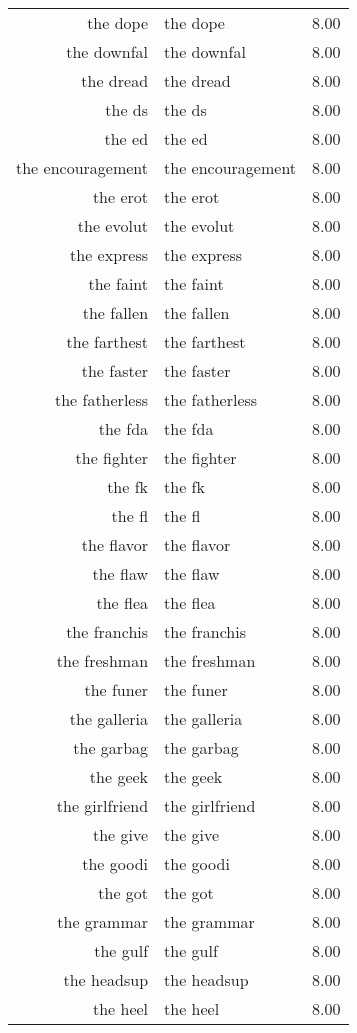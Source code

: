 \begin{table}[ht]
\begin{tabular}{rlr}
  the dope & the dope & 8.00 \\ 
  the downfal & the downfal & 8.00 \\ 
  the dread & the dread & 8.00 \\ 
  the ds & the ds & 8.00 \\ 
  the ed & the ed & 8.00 \\ 
  the encouragement & the encouragement & 8.00 \\ 
  the erot & the erot & 8.00 \\ 
  the evolut & the evolut & 8.00 \\ 
  the express & the express & 8.00 \\ 
  the faint & the faint & 8.00 \\ 
  the fallen & the fallen & 8.00 \\ 
  the farthest & the farthest & 8.00 \\ 
  the faster & the faster & 8.00 \\ 
  the fatherless & the fatherless & 8.00 \\ 
  the fda & the fda & 8.00 \\ 
  the fighter & the fighter & 8.00 \\ 
  the fk & the fk & 8.00 \\ 
  the fl & the fl & 8.00 \\ 
  the flavor & the flavor & 8.00 \\ 
  the flaw & the flaw & 8.00 \\ 
  the flea & the flea & 8.00 \\ 
  the franchis & the franchis & 8.00 \\ 
  the freshman & the freshman & 8.00 \\ 
  the funer & the funer & 8.00 \\ 
  the galleria & the galleria & 8.00 \\ 
  the garbag & the garbag & 8.00 \\ 
  the geek & the geek & 8.00 \\ 
  the girlfriend & the girlfriend & 8.00 \\ 
  the give & the give & 8.00 \\ 
  the goodi & the goodi & 8.00 \\ 
  the got & the got & 8.00 \\ 
  the grammar & the grammar & 8.00 \\ 
  the gulf & the gulf & 8.00 \\ 
  the headsup & the headsup & 8.00 \\ 
  the heel & the heel & 8.00 \\ 

\end{tabular}
\end{table}
